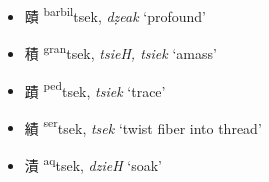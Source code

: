 \begin{itemize}
\begin{itemize}
    \item {\Large{賾}} %
    {\large{{\textsuperscript{barbil}}tsek}},
    \textit{dẓeak} `profound' %

    \item {\Large{積}} %
    {\large{{\textsuperscript{gran}}tsek}},
    \textit{tsieH, tsiek} `amass' %

    \item {\Large{蹟}} %
    {\large{{\textsuperscript{ped}}tsek}},
    \textit{tsiek} `trace' %

    \item {\Large{績}} %
    {\large{{\textsuperscript{ser}}tsek}},
    \textit{tsek} `twist  fiber into thread' %

    \item {\Large{漬}} %
    {\large{{\textsuperscript{aq}}tsek}},
    \textit{dzieH} `soak' %
\end{itemize}
\end{itemize}


